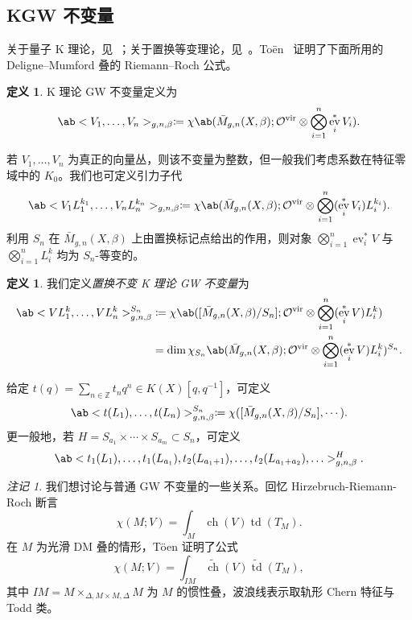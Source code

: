 \documentclass{amsart}
\theoremstyle{definition}
\newtheorem{defn}[thm]{定义}
\theoremstyle{remark}
\newtheorem{rmk}[thm]{注记}
\theoremstyle{plain}
\theoremstyle{definition}
\theoremstyle{remark}
\newcommand{\Z}{\mathbb{Z}}
\newcommand{\mc}[1]{\mathcal{#1}}
\newcommand{\mr}[1]{\mathrm{#1}}
\newcommand{\on}[1]{\operatorname{#1}}
\newcommand{\wt}[1]{\widetilde{#1}}
\newcommand{\1}{\mathbf{1}}
\newcommand{\2}{\mathbf{2}}
\newcommand{\3}{\mathbf{3}}
\newcommand{\vir}{\mr{vir}}
\DeclareMathOperator{\ev}{ev}
\begin{document}
\subsection{KGW 不变量}%
\label{sub:KGW invariants}

关于量子 K 理论，见~\cite{Lee2004}；关于置换等变理论，见~\cite{Givental2017K1,GiventalK7}。To\"en~\cite{Toen1999} 证明了下面所用的 Deligne--Mumford 叠的 Riemann--Roch 公式。

\begin{defn}
    K 理论 GW 不变量定义为
    \[ \ab<V_1, \ldots, V_n>_{g,n,\beta} \coloneqq \chi\ab(\bar{M}_{g,n}(X, \beta); \mc{O}^{\vir} \otimes \bigotimes_{i=1}^n \ev_i^* V_i). \]
\end{defn}

若 \(V_1, \ldots, V_n\) 为真正的向量丛，则该不变量为整数，但一般我们考虑系数在特征零域中的 \(K_0\)。我们也可定义引力子代
\[ \ab<V_1 L_1^{k_1}, \ldots, V_n L_n^{k_n}>_{g,n,\beta} \coloneqq \chi\ab(\bar{M}_{g,n}(X, \beta); \mc{O}^{\vir} \otimes \bigotimes_{i=1}^n ( \ev_i^* V_i )L_i^{k_i} ). \]
利用 \(S_n\) 在 \(\bar{M}_{g,n}(X, \beta)\) 上由置换标记点给出的作用，则对象 \(\bigotimes_{i=1}^n \ev_i^* V\) 与 \(\bigotimes_{i=1}^n L_i^k\) 均为 \(S_n\)-等变的。

\begin{defn}
    我们定义\textit{置换不变 K 理论 GW 不变量}为
    \begin{align*}
        \ab<V L_1^k, \ldots, V L_n^k>_{g,n,\beta}^{S_n} &\coloneqq \chi\ab([ \bar{M}_{g,n}(X, \beta)/S_n ]; \mc{O}^{\vir} \otimes \bigotimes_{i=1}^n ( \ev_i^* V ) L_i^k) \\
        &= \dim \chi_{S_n} \ab(\bar{M}_{g,n}(X, \beta); \mc{O}^{\vir} \otimes \bigotimes_{i=1}^n ( \ev_i^* V ) L_i^k )^{S_n}.
    \end{align*}
\end{defn}

给定 \(t(q) = \sum_{n \in \Z} t_n q^n \in K(X)[q,q^{-1}]\)，可定义
\[ \ab< t(L_1), \ldots, t(L_n)>^{S_n}_{g,n,\beta} \coloneqq \chi ([\bar{M}_{g,n}(X,\beta)/S_n], \cdots). \]
更一般地，若 \(H = S_{a_1} \times \cdots \times S_{a_m} \subset S_n\)，可定义
\[ \ab<t_1(L_1), \ldots, t_1(L_{a_1}), t_2(L_{a_1+1}), \ldots, t_2(L_{a_1+a_2}), \ldots>_{g,n,\beta}^H. \]

\begin{rmk}
    我们想讨论与普通 GW 不变量的一些关系。回忆 Hirzebruch-Riemann-Roch 断言
    \[ \chi(M; V) = \int_M \on{ch}(V) \on{td}(T_M). \]
    在 \(M\) 为光滑 DM 叠的情形，T\"oen 证明了公式
    \[ \chi(M; V) = \int_{IM} \wt{\on{ch}}(V) \wt{\on{td}}(T_M), \]
    其中 \(IM = M \times_{\Delta, M \times M, \Delta} M\) 为 \(M\) 的惯性叠，波浪线表示取轨形 Chern 特征与 Todd 类。
\end{rmk}
\end{document}
